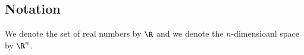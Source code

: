 
\sbasic

















\sstart
{}




\subsection{Notation}

We denote the set of real
numbers by $\R$ and we denote
the $n$-dimensioanl space by $\R^n$.

\strats
